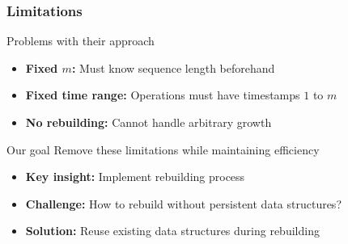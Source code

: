 \documentclass[fleqn]{beamer}
\begin{document}
\begin{frame}
    \frametitle{Limitations}
    
    \begin{alertblock}{Problems with their approach}
        \begin{itemize}
        \item \textbf{Fixed $m$:} Must know sequence length beforehand
        \item \textbf{Fixed time range:} Operations must have timestamps $1$ to $m$
        \item \textbf{No rebuilding:} Cannot handle arbitrary growth
        \end{itemize}
    \end{alertblock} \pause
    
    \begin{block}{Our goal}
        Remove these limitations while maintaining efficiency
    \end{block} \pause
    
    \begin{itemize}
    \item \textbf{Key insight:} Implement rebuilding process \vfill
    \item \textbf{Challenge:} How to rebuild without persistent data structures? \vfill
    \item \textbf{Solution:} Reuse existing data structures during rebuilding \vfill
    \end{itemize}
\end{frame}
\end{document}
